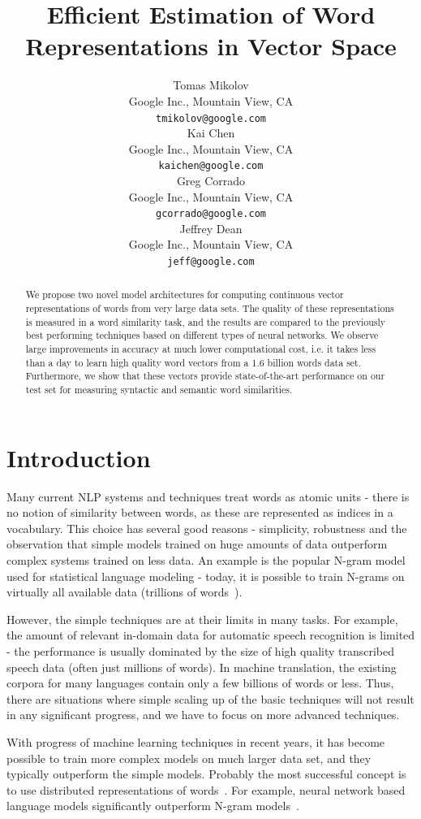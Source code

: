 \documentclass{article} %
\title{Efficient Estimation of Word Representations in Vector Space}
\author{
Tomas Mikolov \\
Google Inc.,
Mountain View, CA \\
\texttt{tmikolov@google.com} \\
\And
Kai Chen \\
Google Inc.,
Mountain View, CA \\
\texttt{kaichen@google.com} \\
\AND
Greg Corrado \\
Google Inc.,
Mountain View, CA \\
\texttt{gcorrado@google.com} \\
\And
Jeffrey Dean \\
Google Inc.,
Mountain View, CA \\
\texttt{jeff@google.com} \\
}
\begin{document}
\renewcommand{\arraystretch}{1.3}

\maketitle

\begin{abstract}
We propose two novel model architectures for computing continuous vector representations of words from very large data sets.
The quality of these representations is measured in a word similarity task, and the results are compared to the previously best performing techniques based on different types of neural networks.
We observe large improvements in accuracy at much lower computational cost, i.e. it takes less than a day to learn high quality word vectors
from a 1.6 billion words data set. Furthermore, we show that these
vectors provide state-of-the-art performance on our test set for measuring syntactic and semantic word similarities.
\end{abstract}

\section{Introduction}

Many current NLP systems and techniques treat words as atomic units - there is no notion of similarity between words, as these are represented as indices in a vocabulary.
This choice has several good reasons - simplicity, robustness and the observation that simple models trained on huge amounts of data
outperform complex systems trained on less data. An example is the popular N-gram model used for statistical language modeling - today, it is possible to
train N-grams on virtually all available data (trillions of words~\cite{stupid-backoff}).

However, the simple techniques are at their limits in many tasks. For example, the amount of relevant in-domain data for automatic speech recognition is limited - the performance is usually dominated by
the size of high quality transcribed speech data (often just millions of words). In machine translation, the existing corpora for many languages contain only a few billions of words or less.
Thus, there are situations where simple scaling up of the basic techniques will not result in any significant progress, and we have to focus on more advanced techniques.

With progress of machine learning techniques in recent years, it has become possible to train more complex models on much larger data set, and they typically outperform the simple models.
Probably the most successful concept is to use distributed representations of words~\cite{Hinton}.
For example, neural network based language models significantly outperform N-gram models~\cite{Bengio, Schwenk, MikolovIS2011}.
\end{document}
